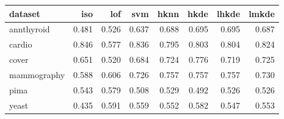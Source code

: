 \begin{tabular}{l|rrr|rrrr}
  \toprule
dataset & iso & lof & svm & hknn & hkde & lhkde & lmkde \\ 
  \midrule
annthyroid & 0.481 & 0.526 & 0.637 & 0.688 & 0.695 & 0.695 & 0.687 \\ 
  cardio & 0.846 & 0.577 & 0.836 & 0.795 & 0.803 & 0.804 & 0.824 \\ 
  cover & 0.651 & 0.520 & 0.684 & 0.724 & 0.776 & 0.719 & 0.725 \\ 
  mammography & 0.588 & 0.606 & 0.726 & 0.757 & 0.757 & 0.757 & 0.730 \\ 
  pima & 0.543 & 0.579 & 0.508 & 0.529 & 0.492 & 0.526 & 0.526 \\ 
  yeast & 0.435 & 0.591 & 0.559 & 0.552 & 0.582 & 0.547 & 0.553 \\ 
   \bottomrule
\end{tabular}

